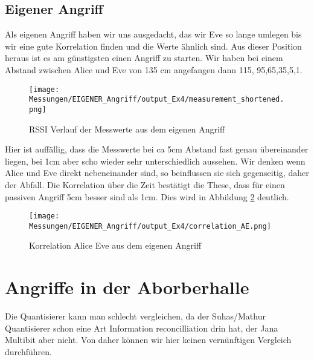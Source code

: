 \documentclass[12pt,a4paper]{article}
\begin{document}
\subsection*{Eigener Angriff}
Als eigenen Angriff haben wir uns ausgedacht, das wir Eve so lange umlegen bis wir eine gute Korrelation finden und die Werte ähnlich sind. Aus dieser Position heraus ist es am günstigsten einen Angriff zu starten. Wir haben bei einem Abstand zwischen Alice und Eve von 135 cm angefangen dann 115, 95,65,35,5,1. 
\begin{figure}[H]
\centering
\texttt{[image: Messungen/EIGENER\_Angriff/output\_Ex4/measurement\_shortened.png]}
\caption{RSSI Verlauf der Messwerte aus dem eigenen Angriff}
\label{fig:e1}
\end{figure}
Hier ist auffällig, dass die Messwerte bei ca 5cm Abstand fast genau übereinander liegen, bei 1cm aber scho wieder sehr unterschiedlich aussehen. Wir denken wenn Alice und Eve direkt nebeneinander sind, so beinflussen sie sich gegenseitig, daher der Abfall.
Die Korrelation über die Zeit bestätigt die These, dass für einen passiven Angriff 5cm besser sind als 1cm. Dies wird in Abbildung \ref{fig:e2} deutlich.
\begin{figure}[H]
\centering
\texttt{[image: Messungen/EIGENER\_Angriff/output\_Ex4/correlation\_AE.png]}
\caption{Korrelation Alice Eve aus dem eigenen Angriff}
\label{fig:e2}
\end{figure}
\section{Angriffe in der Aborberhalle}
Die Quantisierer kann man schlecht vergleichen, da der Suhas/Mathur Quantisierer schon eine Art Information reconcilliation drin hat, der Jana Multibit aber nicht. Von daher können wir hier keinen vernünftigen Vergleich durchführen.
\end{document}
